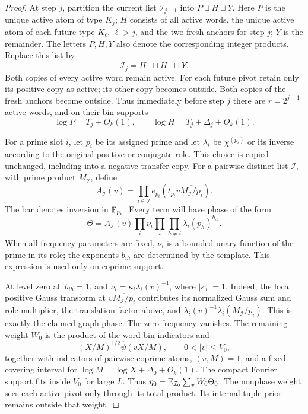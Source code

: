 \begin{proof}
At step \(j\), partition the current list \(\mathcal I_{j-1}\)
into \(P\sqcup H\sqcup Y\). Here \(P\) is the unique active atom
of type \(K_j\); \(H\) consists of all active words, the unique
active atom of each future type \(K_\ell\), \(\ell>j\), and the
two fresh anchors for step \(j\); \(Y\) is the remainder.
The letters \(P,H,Y\) also denote the corresponding integer
products. Replace this list by
\[
 \mathcal I_j=H^+\sqcup H^-\sqcup Y.
\]
Both copies of every active word remain active. For each future
pivot retain only its positive copy as active; its other copy
becomes outside. Both copies of the fresh anchors become outside.
Thus immediately before step \(j\) there are \(r=2^{j-1}\)
active words, and on their bin supports
\begin{equation}\label{eq:src20}
 \log P=T_j+O_k(1),\qquad
 \log H=T_j+\Delta_j+O_k(1).
\end{equation}

For a prime slot \(i\), let \(p_i\) be its assigned prime and
let \(\lambda_i\) be \(\chi^{(p_i)}\) or its inverse according
to the original positive or conjugate role. This choice is copied
unchanged, including into a negative transfer copy.
For a pairwise distinct list \(\mathcal I\), with prime product
\(M_{\mathcal I}\), define
\[
 A_{\mathcal I}(v)=
   \prod_{i\in\mathcal I}
    e_{p_i}\!\left(t_{p_i}v
             \overline{M_{\mathcal I}/p_i}\right).
\]
The bar denotes inversion in \(\mathbb F_{p_i}\). Every term will have
phase of the form
\begin{equation}\label{eq:src21}
 \Theta=A_{\mathcal I}(v)\prod_i\nu_i
       \prod_i\prod_{h\ne i}\lambda_i(p_h)^{b_{ih}}.
\end{equation}
When all frequency parameters are fixed, \(\nu_i\) is a bounded
unary function of the prime in its role; the exponents \(b_{ih}\)
are determined by the template. This expression is used only on
coprime support.

At level zero all \(b_{ih}=1\), and
\(\nu_i=\kappa_i\lambda_i(v)^{-1}\), where \(|\kappa_i|=1\).
Indeed, the local positive Gauss transform at
\(v\overline{M_{\mathcal I}/p_i}\) contributes its normalized
Gauss sum and role multiplier, the translation factor above,
and
\(\lambda_i(v)^{-1}\lambda_i(M_{\mathcal I}/p_i)\).
This is exactly the claimed graph phase. The zero frequency
vanishes. The remaining weight \(W_0\) is the product of the word
bin indicators and
\[
 (X/M)^{1/2}\widehat\psi(vX/M),\qquad 0<|v|\le V_0,
\]
together with indicators of pairwise coprime atoms,
\((v,M)=1\), and a fixed covering interval for
\(\log M=\log X+\Delta_0+O_k(1)\).
The compact Fourier support fits inside \(V_0\) for large \(L\).
Thus
\(\eta_0=\mathbb E_{\mathcal I_0}\sum_v W_0\Theta_0\).
The nonphase weight sees each active pivot only through its
total product. Its internal tuple prior remains outside that weight.


\end{proof}
